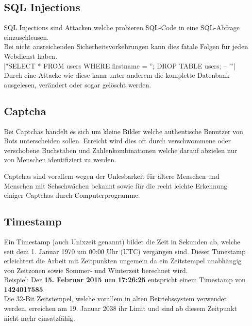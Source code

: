 	\subsection{SQL Injections}
		SQL Injections sind Attacken welche probieren SQL-Code in eine SQL-Abfrage einzuschleusen.\\
		Bei nicht ausreichenden Sicherheitsvorkehrungen kann dies fatale Folgen für jeden Webdienst haben.\\
|"SELECT * FROM users WHERE firstname = ''; DROP TABLE users; -- '"|\\
		
		Durch eine Attacke wie diese kann unter anderem die komplette Datenbank ausgelesen, verändert oder sogar gelöscht werden.
	
	\subsection{Captcha}
		Bei Captchas handelt es sich um kleine Bilder welche authentische Benutzer von Bots unterscheiden sollen.
		Erreicht wird dies oft durch verschwommene oder verschobene Buchstaben und Zahlenkombinationen welche darauf abzielen nur von Menschen identifiziert zu werden.
	
		
		Captchas sind vorallem wegen der Unlesbarkeit für ältere Menschen und Menschen mit Sehschwächen bekannt sowie für die recht leichte Erkennung einiger Captchas durch Computerprogramme.
		
	\subsection{Timestamp}
		Ein Timestamp (auch Unixzeit genannt) bildet die Zeit in Sekunden ab, welche seit dem 1. Januar 1970 um 00:00 Uhr (UTC) vergangen sind.
		Dieser Timestamp erleichtert die Arbeit mit Zeitpunkten ungemein da ein Zeitstempel unabhängig von Zeitzonen sowie Sommer- und Winterzeit berechnet wird.\\
		
		Beispiel: Der \textbf{15. Februar 2015 um 17:26:25} entspricht einem Timestamp von \textbf{1424017585}.\\
		
		Die 32-Bit Zeitstempel, welche vorallem in alten Betriebssystem verwendet werden, erreichen am 19. Januar 2038 ihr Limit und sind ab diesem Zeitpunkt nicht mehr einsatzfähig.
	